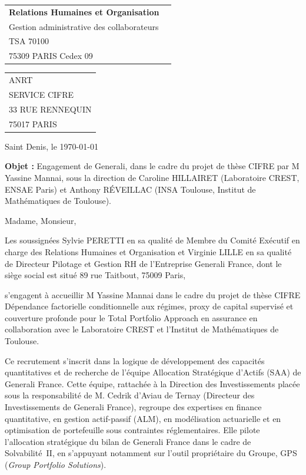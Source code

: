 \documentclass[11pt,a4paper]{article}
\begin{document}
\noindent
\begin{tabularx}{\textwidth}{@{}X r@{}}
\textbf{Relations Humaines et Organisation}      & \\
Gestion administrative des collaborateurs        & \\
TSA 70100                                        & \\
75309 PARIS Cedex 09                             & \\
\end{tabularx}

\bigskip

\noindent
\begin{tabular}{@{}l}
ANRT \\
SERVICE CIFRE \\
33 RUE RENNEQUIN \\
75017 PARIS
\end{tabular}

\vspace{1.5cm}

\noindent Saint Denis, le \today

\bigskip

\noindent\textbf{Objet :} Engagement de Generali, dans le cadre du projet de
thèse CIFRE par M Yassine Mannai, sous la direction de Caroline
HILLAIRET (Laboratoire CREST, ENSAE Paris) et Anthony
R\'{E}VEILLAC (INSA Toulouse, Institut de Math\'{e}matiques de Toulouse).

\bigskip

Madame, Monsieur,

\medskip

Les soussignées Sylvie PERETTI en sa qualité de Membre du Comité Exécutif en
charge des Relations Humaines et Organisation et Virginie LILLE en sa qualité
de Directeur Pilotage et Gestion RH de l'Entreprise Generali France, dont le
siège social est situé 89 rue Taitbout, 75009 Paris,

s'engagent à accueillir M Yassine Mannai dans le cadre du projet de thèse CIFRE
\og Dépendance factorielle conditionnelle aux régimes, proxy de capital supervisé et couverture profonde pour le Total Portfolio Approach en assurance \fg{}
en collaboration avec le Laboratoire CREST et l'Institut de Math\'{e}matiques de Toulouse.

Ce recrutement s'inscrit dans la logique de développement des capacités
quantitatives et de recherche de l'équipe Allocation Stratégique d'Actifs (SAA)
de Generali France. Cette équipe, rattachée à la Direction des Investissements
placée sous la responsabilité de M. Cedrik d'Aviau de Ternay (Directeur des
Investissements de Generali France), regroupe des expertises en finance
quantitative, en gestion actif-passif (ALM), en modélisation actuarielle et
en optimisation de portefeuille sous contraintes réglementaires. Elle pilote
l'allocation stratégique du bilan de Generali France dans le cadre de Solvabilité~II,
en s'appuyant notamment sur l'outil propriétaire du Groupe, GPS (\textit{Group
Portfolio Solutions}).
\end{document}
